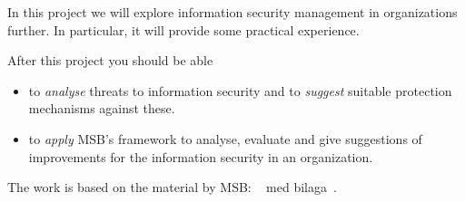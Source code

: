 In this project we will explore information security management in 
organizations further.
In particular, it will provide some practical experience.

After this project you should be able
\begin{itemize}
  \item to \emph{analyse} threats to information security and to \emph{suggest} 
    suitable protection mechanisms against these.
  \item to \emph{apply} MSB's framework to analyse, evaluate and give 
    suggestions of improvements for the information security in an 
    organization.
\end{itemize}

The work is based on the material by MSB:
~\cite{MSB2011gap} med bilaga~\cite{MSB2011gb}.
